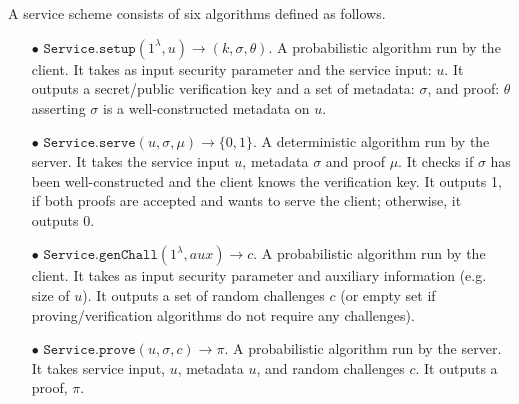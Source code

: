 \begin{definition}\label{service-def}
A service scheme consists of six algorithms defined as follows.

\begin{itemize}
\item[$\bullet$] $\mathtt{Service.setup}(1^{\lambda}, u)\rightarrow (k,\sigma,\theta)$. A probabilistic algorithm run by the client. It takes as input security parameter and the service input: $u$. It outputs a secret/public verification key and a set of metadata: $\sigma$, and proof: $\theta$ asserting  $\sigma$ is a well-constructed metadata on $u$.

\item[$\bullet$] $\mathtt{Service.serve}(u,\sigma,\mu)\rightarrow \{0,1\}$. A deterministic algorithm run by the server. It takes the service input $u$, metadata $\sigma$ and proof $\mu$. It checks if $\sigma$ has been well-constructed and the client knows the verification key. It outputs 1, if both proofs are accepted and wants to serve the client; otherwise, it outputs 0. 

\item[$\bullet$] $\mathtt{Service.genChall}(1^{\lambda}, aux)\rightarrow c$. A probabilistic algorithm run by the client. It takes as input security parameter and auxiliary information (e.g. size of $u$). It outputs a set of random challenges $c$ (or empty set if  proving/verification algorithms do not require any challenges). %


\item[$\bullet$] $\mathtt{Service.prove}(u,\sigma,c)\rightarrow \pi$. A probabilistic algorithm run by the server. It  takes service input, $u$, metadata $u$, and  random challenges $c$. It outputs a proof, $\pi$. %





\end{itemize}
\end{definition}
